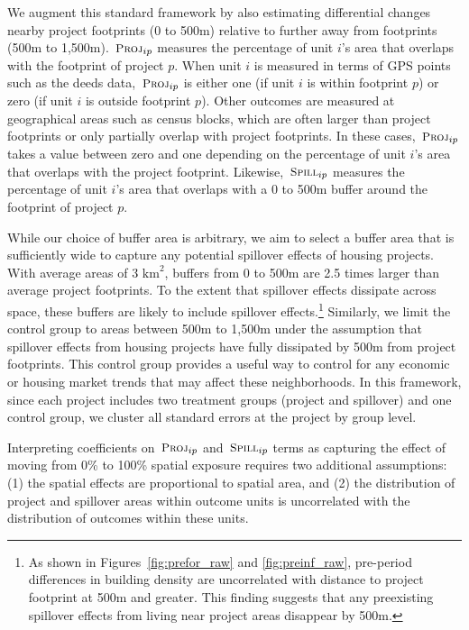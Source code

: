 \documentclass[12pt]{article}
\begin{document}
We augment this standard framework by also estimating differential changes nearby project footprints (0 to 500m) relative to further away from footprints (500m to 1,500m).  $\,\textsc{\small Proj}_{ip}$ measures the percentage of unit $i$'s area that overlaps with the footprint of project $p$.  When unit $i$ is measured in terms of GPS points such as the deeds data, $\,\textsc{\small Proj}_{ip}$ is either one (if unit $i$ is within footprint $p$) or zero (if unit $i$ is outside footprint $p$).  Other outcomes are measured at geographical areas such as census blocks, which are often larger than project footprints or only partially overlap with project footprints.  In these cases, $\,\textsc{\small Proj}_{ip}$ takes a value between zero and one depending on the percentage of unit $i$'s area that overlaps with the project footprint.  Likewise, $\,\textsc{\small Spill}_{ip}$ measures the percentage of unit $i$'s area that overlaps with a 0 to 500m buffer around the footprint of project $p$.  

While our choice of buffer area is arbitrary, we aim to select a buffer area that is sufficiently wide to capture any potential spillover effects of housing projects.  With average areas of 3 $\text{km}^{2}$, buffers from 0 to 500m are 2.5 times larger than average project footprints.  To the extent that spillover effects dissipate across space, these buffers are likely to include spillover effects.\footnote{As shown in Figures~\ref{fig:prefor_raw} and \ref{fig:preinf_raw}, pre-period differences in building density are uncorrelated with distance to project footprint at 500m and greater.  This finding suggests that any preexisting spillover effects from living near project areas disappear by 500m.}  Similarly, we limit the control group to areas between 500m to 1,500m under the assumption that spillover effects from housing projects have fully dissipated by 500m from project footprints.  This control group provides a useful way to control for any economic or housing market trends that may affect these neighborhoods.  In this framework, since each project includes two treatment groups (project and spillover) and one control group, we cluster all standard errors at the project by group level.

Interpreting coefficients on $\,\textsc{\small Proj}_{ip}$ and $\,\textsc{\small Spill}_{ip}$ terms as capturing the effect of moving from 0\% to 100\% spatial exposure requires two additional assumptions: (1) the spatial effects are proportional to spatial area, and (2) the distribution of project and spillover areas within outcome units is uncorrelated with the distribution of outcomes within these units. %
\end{document}
